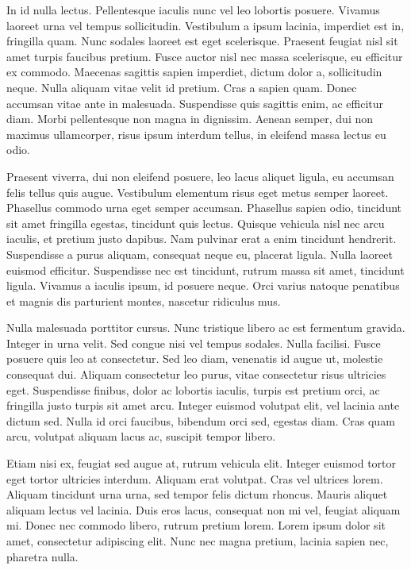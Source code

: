 \documentclass[
  a5paper,
  smalldemyvopaper,10pt,twoside,onecolumn,openright,extrafontsizes,hidelinks]{memoir}
\begin{document}
In id nulla lectus. Pellentesque iaculis nunc vel leo lobortis posuere.
Vivamus laoreet urna vel tempus sollicitudin. Vestibulum a ipsum
lacinia, imperdiet est in, fringilla quam. Nunc sodales laoreet est eget
scelerisque. Praesent feugiat nisl sit amet turpis faucibus pretium.
Fusce auctor nisl nec massa scelerisque, eu efficitur ex commodo.
Maecenas sagittis sapien imperdiet, dictum dolor a, sollicitudin neque.
Nulla aliquam vitae velit id pretium. Cras a sapien quam. Donec accumsan
vitae ante in malesuada. Suspendisse quis sagittis enim, ac efficitur
diam. Morbi pellentesque non magna in dignissim. Aenean semper, dui non
maximus ullamcorper, risus ipsum interdum tellus, in eleifend massa
lectus eu odio.

Praesent viverra, dui non eleifend posuere, leo lacus aliquet ligula, eu
accumsan felis tellus quis augue. Vestibulum elementum risus eget metus
semper laoreet. Phasellus commodo urna eget semper accumsan. Phasellus
sapien odio, tincidunt sit amet fringilla egestas, tincidunt quis
lectus. Quisque vehicula nisl nec arcu iaculis, et pretium justo
dapibus. Nam pulvinar erat a enim tincidunt hendrerit. Suspendisse a
purus aliquam, consequat neque eu, placerat ligula. Nulla laoreet
euismod efficitur. Suspendisse nec est tincidunt, rutrum massa sit amet,
tincidunt ligula. Vivamus a iaculis ipsum, id posuere neque. Orci varius
natoque penatibus et magnis dis parturient montes, nascetur ridiculus
mus.

Nulla malesuada porttitor cursus. Nunc tristique libero ac est fermentum
gravida. Integer in urna velit. Sed congue nisi vel tempus sodales.
Nulla facilisi. Fusce posuere quis leo at consectetur. Sed leo diam,
venenatis id augue ut, molestie consequat dui. Aliquam consectetur leo
purus, vitae consectetur risus ultricies eget. Suspendisse finibus,
dolor ac lobortis iaculis, turpis est pretium orci, ac fringilla justo
turpis sit amet arcu. Integer euismod volutpat elit, vel lacinia ante
dictum sed. Nulla id orci faucibus, bibendum orci sed, egestas diam.
Cras quam arcu, volutpat aliquam lacus ac, suscipit tempor libero.

Etiam nisi ex, feugiat sed augue at, rutrum vehicula elit. Integer
euismod tortor eget tortor ultricies interdum. Aliquam erat volutpat.
Cras vel ultrices lorem. Aliquam tincidunt urna urna, sed tempor felis
dictum rhoncus. Mauris aliquet aliquam lectus vel lacinia. Duis eros
lacus, consequat non mi vel, feugiat aliquam mi. Donec nec commodo
libero, rutrum pretium lorem. Lorem ipsum dolor sit amet, consectetur
adipiscing elit. Nunc nec magna pretium, lacinia sapien nec, pharetra
nulla.
\end{document}
